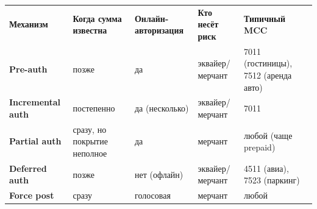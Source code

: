 \begingroup
\renewcommand{\arraystretch}{1.24}
\begin{tabularx}{\textwidth}{
    >{\raggedright\arraybackslash\bfseries}p{}
    >{\raggedright\arraybackslash}p{}
    >{\raggedright\arraybackslash}p{}
    >{\raggedright\arraybackslash}p{}
    Y
  }
  \textbf{Механизм} & \textbf{Когда сумма известна} &
  \textbf{Онлайн-авторизация} & \textbf{Кто несёт риск} &
  \textbf{Типичный MCC}                \\
  Pre-auth          & позже                         & да
  & эквайер/мерчант         & 7011 (гостиницы), 7512 (аренда авто) \\
  Incremental auth  & постепенно                    & да (несколько)
  & эквайер/мерчант         & 7011                                 \\
  Partial auth      & сразу, но покрытие неполное   & да
  & мерчант                 & любой (чаще prepaid)                 \\
  Deferred auth     & позже                         & нет (офлайн)
  & эквайер/мерчант         & 4511 (авиа), 7523 (паркинг)          \\
  Force post        & сразу                         & голосовая
  & мерчант                 & любой                                \\
\end{tabularx}
\endgroup
